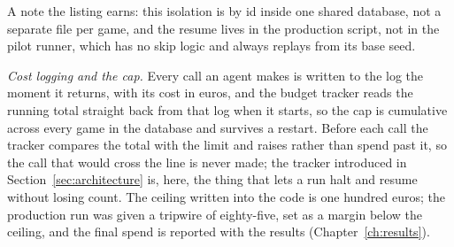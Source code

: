 A note the listing earns: this isolation is by id inside one shared database, not a
separate file per game, and the resume lives in the production script, not in the pilot
runner, which has no skip logic and always replays from its base seed.

\emph{Cost logging and the cap.} Every call an agent makes is written to the log the
moment it returns, with its cost in euros, and the budget tracker reads the running total
straight back from that log when it starts, so the cap is cumulative across every game in
the database and survives a restart. Before each call the tracker compares the total with
the limit and raises rather than spend past it, so the call that would cross the line is
never made; the tracker introduced in Section~\ref{sec:architecture} is, here, the thing
that lets a run halt and resume without losing count. The ceiling written into the code is
one hundred euros; the production run was given a tripwire of eighty-five, set as a margin
below the ceiling, and the final spend is reported with the results
(Chapter~\ref{ch:results}).
